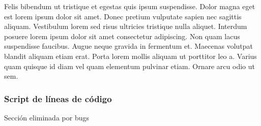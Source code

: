 Felis bibendum ut tristique et egestas quis ipsum suspendisse. Dolor magna eget est lorem ipsum dolor sit amet. Donec pretium vulputate sapien nec sagittis aliquam. Vestibulum lorem sed risus ultricies tristique nulla aliquet. Interdum posuere lorem ipsum dolor sit amet consectetur adipiscing. Non quam lacus suspendisse faucibus. Augue neque gravida in fermentum et. Maecenas volutpat blandit aliquam etiam erat. Porta lorem mollis aliquam ut porttitor leo a. Varius quam quisque id diam vel quam elementum pulvinar etiam. Ornare arcu odio ut sem.




\subsubsection{Script de líneas de código}

Sección eliminada por bugs